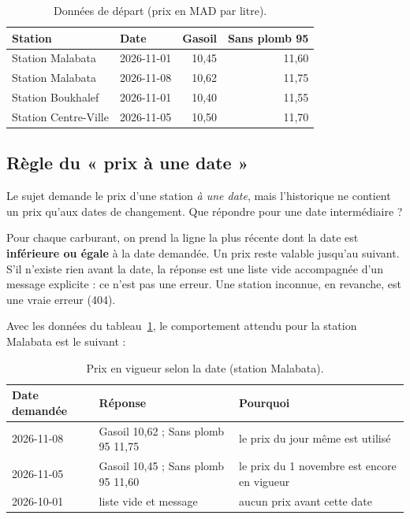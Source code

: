 \documentclass[11pt,a4paper]{article}
\begin{document}
\begin{table}[H]
\centering
\small
\begin{tabular}{@{}llrr@{}}
\toprule
\textbf{Station} & \textbf{Date} & \textbf{Gasoil} & \textbf{Sans plomb 95}\\
\midrule
Station Malabata & 2026-11-01 & 10,45 & 11,60\\
Station Malabata & 2026-11-08 & 10,62 & 11,75\\
Station Boukhalef & 2026-11-01 & 10,40 & 11,55\\
Station Centre-Ville & 2026-11-05 & 10,50 & 11,70\\
\bottomrule
\end{tabular}
\caption{Données de départ (prix en MAD par litre).}
\label{tab:donnees}
\end{table}

\subsection{Règle du « prix à une date »}
Le sujet demande le prix d'une station \emph{à une date}, mais l'historique ne contient un prix qu'aux dates de changement. Que répondre pour une date intermédiaire ?

\begin{decision}
Pour chaque carburant, on prend la ligne la plus récente dont la date est \textbf{inférieure ou égale} à la date demandée. Un prix reste valable jusqu'au suivant. S'il n'existe rien avant la date, la réponse est une liste vide accompagnée d'un message explicite : ce n'est pas une erreur. Une station inconnue, en revanche, est une vraie erreur (404).
\end{decision}

Avec les données du tableau~\ref{tab:donnees}, le comportement attendu pour la station Malabata est le suivant :

\begin{table}[H]
\centering
\small
\begin{tabular}{@{}lll@{}}
\toprule
\textbf{Date demandée} & \textbf{Réponse} & \textbf{Pourquoi}\\
\midrule
2026-11-08 & Gasoil 10,62 ; Sans plomb 95 11,75 & le prix du jour même est utilisé\\
2026-11-05 & Gasoil 10,45 ; Sans plomb 95 11,60 & le prix du 1\ier{} novembre est encore en vigueur\\
2026-10-01 & liste vide et message & aucun prix avant cette date\\
\bottomrule
\end{tabular}
\caption{Prix en vigueur selon la date (station Malabata).}
\label{tab:vigueur}
\end{table}
\end{document}
